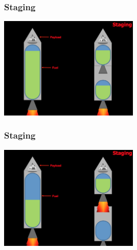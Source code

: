 \begin{frame}
    \frametitle{Staging}
    \begin{block}{}
        \begin{center}
            \includegraphics[width=0.5\textwidth]{images/staging1}
        \end{center}
    \end{block}
\end{frame}
\begin{frame}
    \frametitle{Staging}
    \begin{block}{}
        \begin{center}
            \includegraphics[width=0.5\textwidth]{images/staging2}
        \end{center}
    \end{block}
\end{frame}

